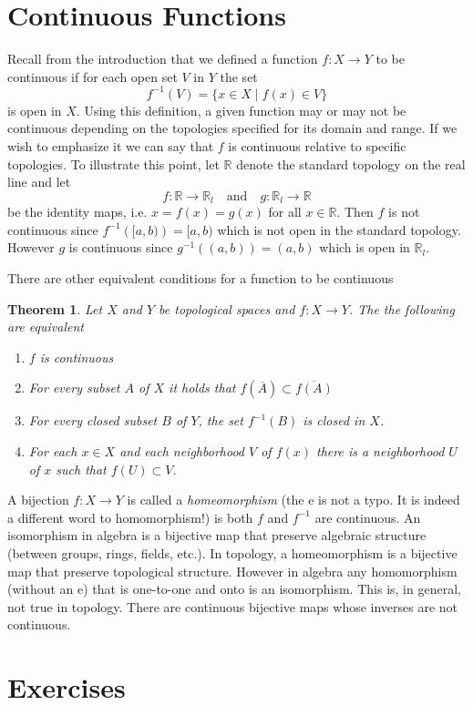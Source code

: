 \documentclass{article}
\newcommand{\R}{\mathbb{R}}
\newtheorem{theorem}{Theorem}[section]
\theoremstyle{remark}
\begin{document}
\section{Continuous Functions}
Recall from the introduction that we defined a function $f:X\to Y$ to be continuous if for each open set $V$ in $Y$ the set
$$f^{-1}(V)=\{x\in X\mid f(x)\in V\} $$
is open in $X$. Using this definition, a given function may or may not be continuous depending on the topologies specified for its domain and range. 
If we wish to emphasize it we can say that $f$ is continuous relative to specific topologies.
To illustrate this point, let $\R$ denote the standard topology on the real line and let
$$
    f:\R\to\R_l\quad\text{and}\quad g:\R_l\to\R
$$
be the identity maps, i.e. $x=f(x)=g(x)$ for all $x\in\R$.
Then $f$ is not continuous since $f^{-1}\left([a,b)\right)=[a,b)$ which is not open in the standard topology.
However $g$ is continuous since $g^{-1}\left((a,b)\right)=(a,b)$ which is open in $\R_l$.

There are other equivalent conditions for a function to be continuous
\begin{theorem}
    Let $X$ and $Y$ be topological spaces and $f:X\to Y$. The the following are equivalent
    \begin{enumerate}
        \item $f$ is continuous
        \item For every subset $A$ of $X$ it holds that $f\left(\overline{A}\right)\subset\overline{f(A)}$
        \item For every closed subset $B$ of $Y$, the set $f^{-1}(B)$ is closed in $X$.
        \item For each $x\in X$ and each neighborhood $V$ of $f(x)$ there is a neighborhood $U$ of $x$ such that $f(U)\subset V$.
    \end{enumerate}
\end{theorem}

A bijection $f:X\to Y$ is called a \textit{homeomorphism} (the e is not a typo. It is indeed a different word to homomorphism!) is both $f$ and $f^{-1}$ are continuous.
An isomorphism in algebra is a bijective map that preserve algebraic structure (between groups, rings, fields, etc.).
In topology, a homeomorphism is a bijective map that preserve topological structure. However in algebra any homomorphism (without an e) that is one-to-one and onto is an isomorphism.
This is, in general, not true in topology. There are continuous bijective maps whose inverses are not continuous. 

\newpage
\section{Exercises}

    
\end{document}
